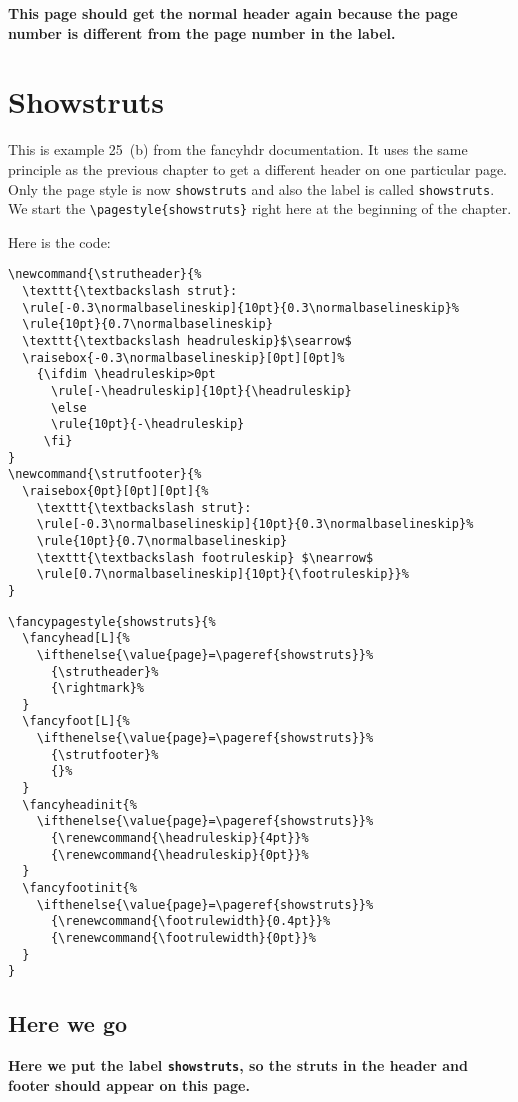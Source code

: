 \documentclass[openany]{book}
\newcommand{\strutheader}{%
  \texttt{\textbackslash strut}:
  \rule[-0.3\normalbaselineskip]{10pt}{0.3\normalbaselineskip}%
  \rule{10pt}{0.7\normalbaselineskip}
  \texttt{\textbackslash headruleskip}$\searrow$
  \raisebox{-0.3\normalbaselineskip}[0pt][0pt]%
    {\ifdim \headruleskip>0pt
      \rule[-\headruleskip]{10pt}{\headruleskip}
      \else
      \rule{10pt}{-\headruleskip}
     \fi}
}
\newcommand{\strutfooter}{%
  \raisebox{0pt}[0pt][0pt]{%
    \texttt{\textbackslash strut}:
    \rule[-0.3\normalbaselineskip]{10pt}{0.3\normalbaselineskip}%
    \rule{10pt}{0.7\normalbaselineskip}
    \texttt{\textbackslash footruleskip} $\nearrow$
    \rule[0.7\normalbaselineskip]{10pt}{\footruleskip}}%
}
\begin{document}
\medskip

\noindent
\begin{boxedminipage}{\textwidth}
\textbf{This page should get the normal header again because the page number is different from the page number in the label.}
\end{boxedminipage}

\chapter{Showstruts}
\label{ch:showstruts}
\pagestyle{showstruts}

\begin{boxedminipage}{\textwidth}
This is example 25~(b) from the \textsf{fancyhdr} documentation. It uses the same principle as the previous chapter to get a different header on one particular page.
Only the page style is now \texttt{showstruts} and also the label is called \texttt{showstruts}.
We start the \verb|\pagestyle{showstruts}| right here at the beginning of the chapter.

Here is the code:

\begin{verbatim}
\newcommand{\strutheader}{%
  \texttt{\textbackslash strut}:
  \rule[-0.3\normalbaselineskip]{10pt}{0.3\normalbaselineskip}%
  \rule{10pt}{0.7\normalbaselineskip}
  \texttt{\textbackslash headruleskip}$\searrow$
  \raisebox{-0.3\normalbaselineskip}[0pt][0pt]%
    {\ifdim \headruleskip>0pt
      \rule[-\headruleskip]{10pt}{\headruleskip}
      \else
      \rule{10pt}{-\headruleskip}
     \fi}
}
\newcommand{\strutfooter}{%
  \raisebox{0pt}[0pt][0pt]{%
    \texttt{\textbackslash strut}:
    \rule[-0.3\normalbaselineskip]{10pt}{0.3\normalbaselineskip}%
    \rule{10pt}{0.7\normalbaselineskip}
    \texttt{\textbackslash footruleskip} $\nearrow$
    \rule[0.7\normalbaselineskip]{10pt}{\footruleskip}}%
}
\end{verbatim}
\end{boxedminipage}

\noindent
\begin{boxedminipage}{\textwidth}
\begin{verbatim}
\fancypagestyle{showstruts}{%
  \fancyhead[L]{%
    \ifthenelse{\value{page}=\pageref{showstruts}}%
      {\strutheader}%
      {\rightmark}%
  }
  \fancyfoot[L]{%
    \ifthenelse{\value{page}=\pageref{showstruts}}%
      {\strutfooter}%
      {}%
  }
  \fancyheadinit{%
    \ifthenelse{\value{page}=\pageref{showstruts}}%
      {\renewcommand{\headruleskip}{4pt}}%
      {\renewcommand{\headruleskip}{0pt}}%
  }
  \fancyfootinit{%
    \ifthenelse{\value{page}=\pageref{showstruts}}%
      {\renewcommand{\footrulewidth}{0.4pt}}%
      {\renewcommand{\footrulewidth}{0pt}}%
  }
}
\end{verbatim}
\end{boxedminipage}

\section{Here we go}

\lipsum[1-3]

\medskip
\noindent
\begin{boxedminipage}{\textwidth}
\textbf{Here we put the label \texttt{showstruts}, so the struts in the header and footer should appear on this page.}
\label{showstruts}
\end{boxedminipage}
\medskip

\lipsum[3-5]
\end{document}
